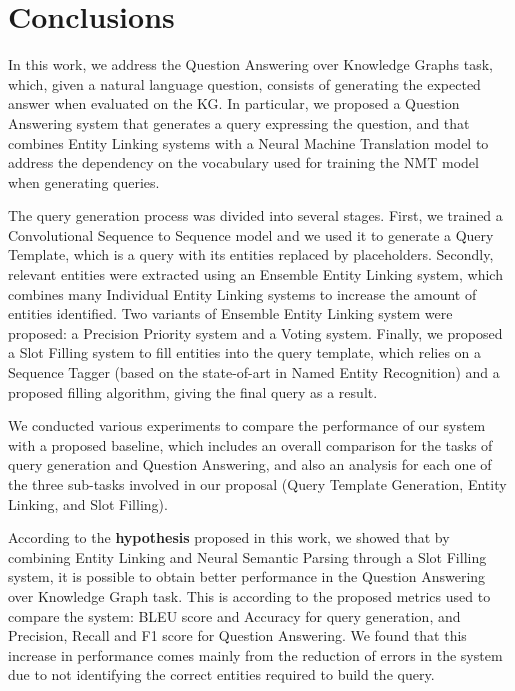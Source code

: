 \chapter{Conclusions}
\label{cap6:conclusions}
In this work, we address the Question Answering over Knowledge Graphs task, which, given a natural 
language question, consists of generating the expected answer when evaluated on the KG. In particular, 
we proposed a Question Answering system that generates a \SPARQL{} query expressing the question, and that 
combines Entity Linking systems with a Neural Machine Translation model to address the dependency on the 
vocabulary used for training the NMT model when generating \SPARQL{} queries.

The \SPARQL{} query generation process was divided into several stages. First, we trained a 
Convolutional Sequence to Sequence model and we used it to generate a Query Template, which is a 
\SPARQL{} query with its entities replaced by placeholders. Secondly, relevant entities were extracted 
using an Ensemble Entity Linking system, which combines many Individual Entity Linking systems to 
increase the amount of entities identified. Two variants of Ensemble Entity Linking system were 
proposed: a Precision Priority system and a Voting system. Finally, we proposed a Slot Filling system 
to fill entities into the query template, which relies on a Sequence Tagger (based on the 
state-of-art in Named Entity Recognition) and a proposed filling algorithm, giving the final \SPARQL{} 
query as a result.

We conducted various experiments to compare the performance of our system with a proposed baseline, 
which includes an overall comparison for the tasks of \SPARQL{} query generation and Question Answering, 
and also an analysis for each one of the three sub-tasks involved in our proposal (Query Template 
Generation, Entity Linking, and Slot Filling).

According to the \textbf{hypothesis} proposed in this work, we showed that by combining Entity 
Linking and Neural Semantic Parsing through a Slot Filling system, it is possible to obtain better 
performance in the Question Answering over Knowledge Graph task. This is according to the proposed 
metrics used to compare the system: BLEU score and Accuracy for \SPARQL{} query generation, and Precision, 
Recall and F1 score for Question Answering. We found that this increase in performance comes mainly 
from the reduction of errors in the system due to not identifying the correct entities required to 
build the \SPARQL{} query.

